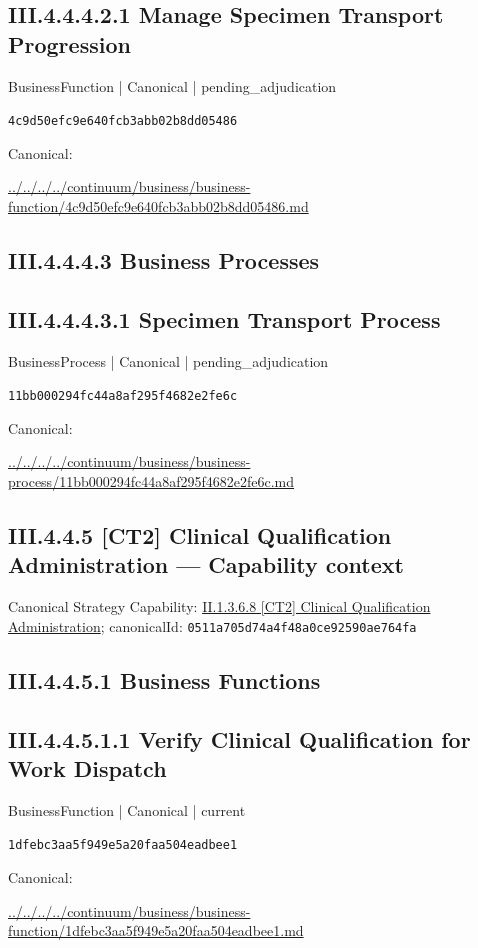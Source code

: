 \documentclass[10pt,a4paper]{article}
\begin{document}
\subsection*{III.4.4.4.2.1 Manage Specimen Transport Progression}
\label{element-4c9d50efc9e640fcb3abb02b8dd05486}
{\small BusinessFunction | Canonical | pending\_adjudication}\par
\texttt{4c9d50efc9e640fcb3abb02b8dd05486}\par
Canonical: \par
{\footnotesize\url{../../../../continuum/business/business-function/4c9d50efc9e640fcb3abb02b8dd05486.md}}\par
\subsection*{III.4.4.4.3 Business Processes}
\subsection*{III.4.4.4.3.1 Specimen Transport Process}
\label{element-11bb000294fc44a8af295f4682e2fe6c}
{\small BusinessProcess | Canonical | pending\_adjudication}\par
\texttt{11bb000294fc44a8af295f4682e2fe6c}\par
Canonical: \par
{\footnotesize\url{../../../../continuum/business/business-process/11bb000294fc44a8af295f4682e2fe6c.md}}\par
\subsection*{III.4.4.5 [CT2] Clinical Qualification Administration — Capability context}
Canonical Strategy Capability: \hyperref[element-0511a705d74a4f48a0ce92590ae764fa]{II.1.3.6.8 [CT2] Clinical Qualification Administration}; canonicalId: \texttt{0511a705d74a4f48a0ce92590ae764fa}\par
\subsection*{III.4.4.5.1 Business Functions}
\subsection*{III.4.4.5.1.1 Verify Clinical Qualification for Work Dispatch}
\label{element-1dfebc3aa5f949e5a20faa504eadbee1}
{\small BusinessFunction | Canonical | current}\par
\texttt{1dfebc3aa5f949e5a20faa504eadbee1}\par
Canonical: \par
{\footnotesize\url{../../../../continuum/business/business-function/1dfebc3aa5f949e5a20faa504eadbee1.md}}\par
\end{document}
